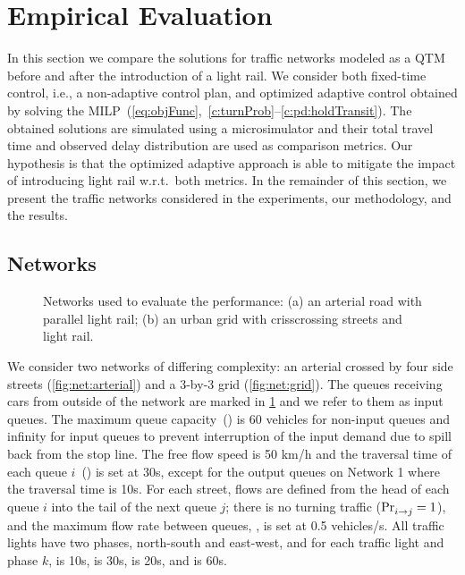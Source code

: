 \section{Empirical Evaluation}
  
In this section we compare the solutions for traffic networks modeled as a QTM
before and after the introduction of a light rail.
%
We consider both fixed-time control, i.e., a non-adaptive control plan, and
optimized adaptive control obtained by solving the
MILP~(\ref{eq:objFunc},~\ref{c:turnProb}--\ref{c:pd:holdTransit}).
%
The obtained solutions are simulated using a microsimulator and their total
travel time and observed delay distribution are used as comparison metrics.
%
Our hypothesis is that the optimized adaptive approach is able to mitigate the
impact of introducing light rail w.r.t.\ both metrics.
%
In the remainder of this section, we present the traffic networks considered in
the experiments, our methodology, and the results.






\subsection{Networks}

\begin{figure}[t!]
\centering
\caption{Networks used to evaluate the performance:
  (a) an arterial road with parallel light rail;
  (b) an urban grid with crisscrossing streets and light rail.
%
}
\label{fig:networks}
\end{figure}

We consider two networks of differing complexity: an arterial crossed by four
side streets (\cref{fig:net:arterial}) and a 3-by-3 grid (\cref{fig:net:grid}).
%
The queues receiving cars from outside of the network are
marked in \cref{fig:networks} and we refer to them as input queues.
%
The maximum queue capacity~() is 60 vehicles for non-input queues and
infinity for input queues to prevent interruption of the input demand due to
spill back from the stop line. 
%
The free flow speed is 50 km/h and the traversal time of each queue $i$~() is set at 30s,
except for the output queues on Network 1 where the traversal
time is 10s.
%
For each street, flows are defined from the head of each queue $i$ into the tail
of the next queue $j$;
%
there is no turning traffic ($\mathrm{Pr}_{i\to j}^{\mathrm{}}=1$), and the maximum flow rate
between queues, , is set at 0.5 vehicles/s.
%
All traffic lights have two phases, north-south and east-west, and for each
traffic light \tl and phase $k$,  is 10s,  is 30s,
\CTMIN{\tl} is 20s, and \CTMAX{\tl} is 60s.



